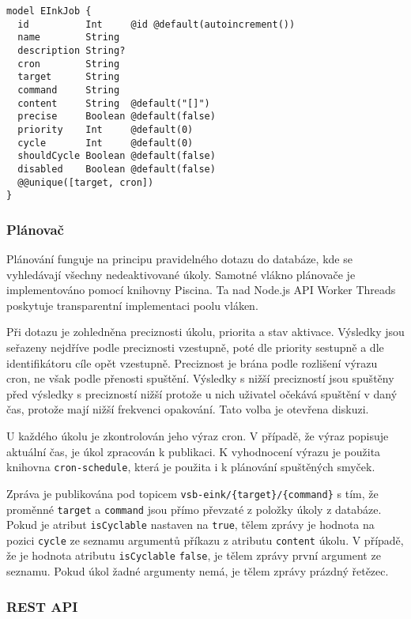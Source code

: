 \begin{lstlisting}[label=src:scheduler-schema,caption={Datové schéma třídy EInkJob}]
model EInkJob {
  id          Int     @id @default(autoincrement())
  name        String
  description String?
  cron        String
  target      String
  command     String
  content     String  @default("[]")
  precise     Boolean @default(false)
  priority    Int     @default(0)
  cycle       Int     @default(0)
  shouldCycle Boolean @default(false)
  disabled    Boolean @default(false)
  @@unique([target, cron])
}
\end{lstlisting}

\subsubsection{Plánovač}
Plánování funguje na principu pravidelného dotazu do databáze, kde se vyhledávají všechny nedeaktivované úkoly. Samotné vlákno plánovače je implementováno pomocí knihovny Piscina. Ta nad Node.js API Worker Threads poskytuje transparentní implementaci poolu vláken.

Při dotazu je zohledněna preciznosti úkolu, priorita a stav aktivace. Výsledky jsou seřazeny nejdříve podle preciznosti vzestupně, poté dle priority sestupně a dle identifikátoru cíle opět vzestupně. Preciznost je brána podle rozlišení výrazu cron, ne však podle přenosti spuštění. Výsledky s nižší precizností jsou spuštěny před výsledky s precizností nižší protože u nich uživatel očekává spuštění v daný čas, protože mají nižší frekvenci opakování. Tato volba je otevřena diskuzi.

U každého úkolu je zkontrolován jeho výraz cron. V případě, že výraz popisuje aktuální čas, je úkol zpracován k publikaci. K vyhodnocení výrazu je použita knihovna \lstinline{cron-schedule}, která je použita i k plánování spuštěných smyček.

Zpráva je publikována pod topicem \lstinline|vsb-eink/{target}/{command}| s tím, že proměnné \lstinline{target} a \lstinline{command} jsou přímo převzaté z položky úkoly z databáze. Pokud je atribut \lstinline{isCyclable} nastaven na \lstinline{true}, tělem zprávy je hodnota na pozici \lstinline{cycle} ze seznamu argumentů příkazu z atributu \lstinline{content} úkolu. V případě, že je hodnota atributu \lstinline{isCyclable} \lstinline{false}, je tělem zprávy první argument ze seznamu. Pokud úkol žadné argumenty nemá, je tělem zprávy prázdný řetězec.

\subsubsection{REST API}
